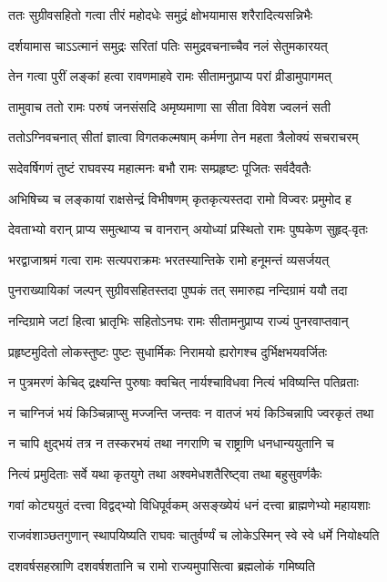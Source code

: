 \twolineshloka
{ततः सुग्रीवसहितो गत्वा तीरं महोदधेः}
{समुद्रं क्षोभयामास शरैरादित्यसन्निभैः}%

\twolineshloka
{दर्शयामास चाऽऽत्मानं समुद्रः सरितां पतिः}
{समुद्रवचनाच्चैव नलं सेतुमकारयत्}%

\twolineshloka
{तेन गत्वा पुरीं लङ्कां हत्वा रावणमाहवे}
{रामः सीतामनुप्राप्य परां व्रीडामुपागमत्}%

\twolineshloka
{तामुवाच ततो रामः परुषं जनसंसदि}
{अमृष्यमाणा सा सीता विवेश ज्वलनं सती}%

\twolineshloka
{ततोऽग्निवचनात् सीतां ज्ञात्वा विगतकल्मषाम्}
{कर्मणा तेन महता त्रैलोक्यं सचराचरम्}%

\twolineshloka
{सदेवर्षिगणं तुष्टं राघवस्य महात्मनः}
{बभौ रामः सम्प्रहृष्टः पूजितः सर्वदैवतैः}%

\twolineshloka
{अभिषिच्य च लङ्कायां राक्षसेन्द्रं विभीषणम्}
{कृतकृत्यस्तदा रामो विज्वरः प्रमुमोद ह}%

\twolineshloka
{देवताभ्यो वरान् प्राप्य समुत्थाप्य च वानरान्}
{अयोध्यां प्रस्थितो रामः पुष्पकेण सुहृद्-वृतः}%

\twolineshloka
{भरद्वाजाश्रमं गत्वा रामः सत्यपराक्रमः}
{भरतस्यान्तिके रामो हनूमन्तं व्यसर्जयत्}%

\twolineshloka
{पुनराख्यायिकां जल्पन् सुग्रीवसहितस्तदा}
{पुष्पकं तत् समारुह्य नन्दिग्रामं ययौ तदा}%

\twolineshloka
{नन्दिग्रामे जटां हित्वा भ्रातृभिः सहितोऽनघः}
{रामः सीतामनुप्राप्य राज्यं पुनरवाप्तवान्}%

\twolineshloka
{प्रहृष्टमुदितो लोकस्तुष्टः पुष्टः सुधार्मिकः}
{निरामयो ह्यरोगश्च दुर्भिक्षभयवर्जितः}%

\twolineshloka
{न पुत्रमरणं केचिद् द्रक्ष्यन्ति पुरुषाः क्वचित्}
{नार्यश्चाविधवा नित्यं भविष्यन्ति पतिव्रताः}%

\twolineshloka
{न चाग्निजं भयं किञ्चिन्नाप्सु मज्जन्ति जन्तवः}
{न वातजं भयं किञ्चिन्नापि ज्वरकृतं तथा}%

\twolineshloka
{न चापि क्षुद्भयं तत्र न तस्करभयं तथा}
{नगराणि च राष्ट्राणि धनधान्ययुतानि च}%

\twolineshloka
{नित्यं प्रमुदिताः सर्वे यथा कृतयुगे तथा}
{अश्वमेधशतैरिष्ट्वा तथा बहुसुवर्णकैः}%

\twolineshloka
{गवां कोट्ययुतं दत्त्वा विद्वद्‌भ्यो विधिपूर्वकम्}
{असङ्ख्येयं धनं दत्त्वा ब्राह्मणेभ्यो महायशाः}%

\twolineshloka
{राजवंशाञ्छतगुणान् स्थापयिष्यति राघवः}
{चातुर्वर्ण्यं च लोकेऽस्मिन् स्वे स्वे धर्मे नियोक्ष्यति}%

\twolineshloka
{दशवर्षसहस्राणि दशवर्षशतानि च}
{रामो राज्यमुपासित्वा ब्रह्मलोकं गमिष्यति}%

